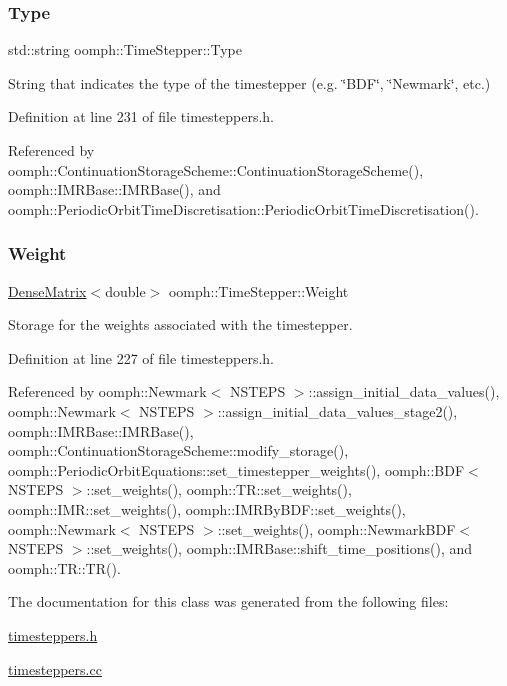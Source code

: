 \subsubsection{\texorpdfstring{Type}{Type}}
{\footnotesize\ttfamily std\+::string oomph\+::\+Time\+Stepper\+::\+Type\hspace{0.3cm}{\ttfamily [protected]}}



String that indicates the type of the timestepper (e.\+g. \char`\"{}\+B\+D\+F\char`\"{}, \char`\"{}\+Newmark\char`\"{}, etc.) 



Definition at line 231 of file timesteppers.\+h.



Referenced by oomph\+::\+Continuation\+Storage\+Scheme\+::\+Continuation\+Storage\+Scheme(), oomph\+::\+I\+M\+R\+Base\+::\+I\+M\+R\+Base(), and oomph\+::\+Periodic\+Orbit\+Time\+Discretisation\+::\+Periodic\+Orbit\+Time\+Discretisation().

\mbox{\label{classoomph_1_1TimeStepper_a0dbf867c7f0e06f790a470d547b6b3f2}} 
\subsubsection{\texorpdfstring{Weight}{Weight}}
{\footnotesize\ttfamily \hyperlink{classoomph_1_1DenseMatrix}{Dense\+Matrix}$<$double$>$ oomph\+::\+Time\+Stepper\+::\+Weight\hspace{0.3cm}{\ttfamily [protected]}}



Storage for the weights associated with the timestepper. 



Definition at line 227 of file timesteppers.\+h.



Referenced by oomph\+::\+Newmark$<$ N\+S\+T\+E\+P\+S $>$\+::assign\+\_\+initial\+\_\+data\+\_\+values(), oomph\+::\+Newmark$<$ N\+S\+T\+E\+P\+S $>$\+::assign\+\_\+initial\+\_\+data\+\_\+values\+\_\+stage2(), oomph\+::\+I\+M\+R\+Base\+::\+I\+M\+R\+Base(), oomph\+::\+Continuation\+Storage\+Scheme\+::modify\+\_\+storage(), oomph\+::\+Periodic\+Orbit\+Equations\+::set\+\_\+timestepper\+\_\+weights(), oomph\+::\+B\+D\+F$<$ N\+S\+T\+E\+P\+S $>$\+::set\+\_\+weights(), oomph\+::\+T\+R\+::set\+\_\+weights(), oomph\+::\+I\+M\+R\+::set\+\_\+weights(), oomph\+::\+I\+M\+R\+By\+B\+D\+F\+::set\+\_\+weights(), oomph\+::\+Newmark$<$ N\+S\+T\+E\+P\+S $>$\+::set\+\_\+weights(), oomph\+::\+Newmark\+B\+D\+F$<$ N\+S\+T\+E\+P\+S $>$\+::set\+\_\+weights(), oomph\+::\+I\+M\+R\+Base\+::shift\+\_\+time\+\_\+positions(), and oomph\+::\+T\+R\+::\+T\+R().



The documentation for this class was generated from the following files\+:\begin{DoxyCompactItemize}
\item 
\hyperlink{timesteppers_8h}{timesteppers.\+h}\item 
\hyperlink{timesteppers_8cc}{timesteppers.\+cc}\end{DoxyCompactItemize}
